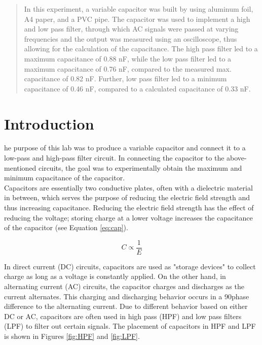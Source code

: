 \documentclass[journal]{IEEEtran}
\begin{document}
\begin{abstract}
In this experiment, a variable capacitor was built by using aluminum foil, A4 paper, and a PVC pipe. The capacitor was used to implement a high and low pass filter, through which AC signals were passed at varying frequencies and the output was measured using an oscilloscope, thus allowing for the calculation of the capacitance. The high pass filter led to a maximum capacitance of 0.88 nF, while the low pass filter led to a maximum capacitance of 0.76 nF, compared to the measured max. capacitance of 0.82 nF. Further, low pass filter led to a minimum capacitance of 0.46 nF, compared to a calculated capacitance of 0.33 nF.
\end{abstract}










\section{Introduction}
\lowercase{he} purpose of this lab was to produce a variable capacitor and connect it to a low-pass and high-pass filter circuit. In connecting the capacitor to the above-mentioned circuits, the goal was to experimentally obtain the maximum and minimum capacitance of the capacitor.\\

\noindent Capacitors are essentially two conductive plates, often with a dielectric material in between, which serves the purpose of reducing the electric field strength and thus increasing capacitance. Reducing the electric field strength has the effect of reducing the voltage; storing charge at a lower voltage increases the capacitance of the capacitor (see Equation \ref{eq:cap}).

\begin{equation}
C \propto \frac{1}{E}
\label{eq:cap}
\end{equation}

\noindent In direct current (DC) circuits, capacitors are used as "storage devices" to collect charge as long as a voltage is constantly applied. On the other hand, in alternating current (AC) circuits, the capacitor charges and discharges as the current alternates. This charging and discharging behavior occurs in a 90\degree  phase difference to the alternating current. Due to different behavior based on either DC or AC, capacitors are often used in high pass (HPF) and low pass filters (LPF) to filter out certain signals. The placement of capacitors in HPF and LPF is shown in Figures \ref{fig:HPF} and \ref{fig:LPF}.
\end{document}
